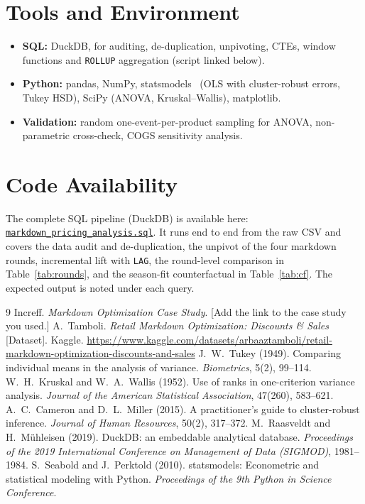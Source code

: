 \documentclass[11pt, a4paper]{article}
\begin{document}
\section*{Tools and Environment}
\begin{itemize}
  \item \textbf{SQL:} DuckDB, for auditing, de-duplication, unpivoting, CTEs, window functions and \texttt{ROLLUP} aggregation (script linked below).
  \item \textbf{Python:} pandas, NumPy, statsmodels~\cite{statsmodels} (OLS with cluster-robust errors, Tukey HSD), SciPy (ANOVA, Kruskal--Wallis), matplotlib.
  \item \textbf{Validation:} random one-event-per-product sampling for ANOVA, non-parametric cross-check, COGS sensitivity analysis.
\end{itemize}

\section*{Code Availability}
The complete SQL pipeline (DuckDB) is available here: \href{https://drive.google.com/your-sql-file-link}{\texttt{markdown\_pricing\_analysis.sql}}. It runs end to end from the raw CSV and covers the data audit and de-duplication, the unpivot of the four markdown rounds, incremental lift with \texttt{LAG}, the round-level comparison in Table~\ref{tab:rounds}, and the season-fit counterfactual in Table~\ref{tab:cf}. The expected output is noted under each query.

\begin{thebibliography}{9}
 Increff. \textit{Markdown Optimization Case Study}. [Add the link to the case study you used.]
 A.~Tamboli. \textit{Retail Markdown Optimization: Discounts \& Sales} [Dataset]. Kaggle. \url{https://www.kaggle.com/datasets/arbaaztamboli/retail-markdown-optimization-discounts-and-sales}
 J.~W.~Tukey (1949). Comparing individual means in the analysis of variance. \textit{Biometrics}, 5(2), 99--114.
 W.~H.~Kruskal and W.~A.~Wallis (1952). Use of ranks in one-criterion variance analysis. \textit{Journal of the American Statistical Association}, 47(260), 583--621.
 A.~C.~Cameron and D.~L.~Miller (2015). A practitioner's guide to cluster-robust inference. \textit{Journal of Human Resources}, 50(2), 317--372.
 M.~Raasveldt and H.~M\"uhleisen (2019). DuckDB: an embeddable analytical database. \textit{Proceedings of the 2019 International Conference on Management of Data (SIGMOD)}, 1981--1984.
 S.~Seabold and J.~Perktold (2010). statsmodels: Econometric and statistical modeling with Python. \textit{Proceedings of the 9th Python in Science Conference}.
\end{thebibliography}
\end{document}
